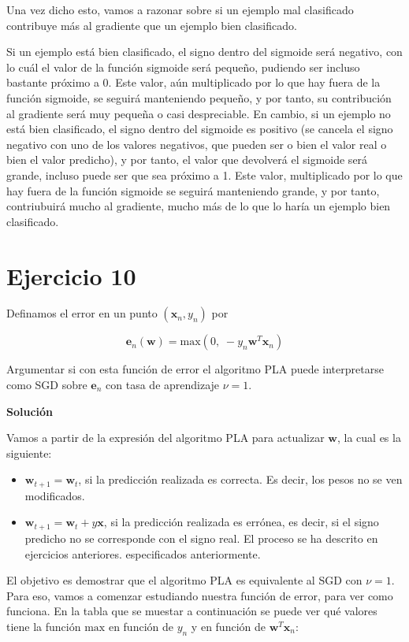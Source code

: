 \documentclass[11pt,a4paper]{article}
\newcommand{\answer}{\noindent\textbf{Solución}}
\newcommand{\maximum}{\text{max}}
\begin{document}
Una vez dicho esto, vamos a razonar sobre si un ejemplo mal clasificado contribuye más al gradiente que un ejemplo bien
clasificado.

Si un ejemplo está bien clasificado, el signo dentro del sigmoide será negativo, con lo cuál el valor de la función sigmoide
será pequeño, pudiendo ser incluso bastante próximo a 0. Este valor, aún multiplicado por lo que hay fuera de la función
sigmoide, se seguirá manteniendo pequeño, y por tanto, su contribución al gradiente será muy pequeña o casi despreciable.
En cambio, si un ejemplo no está bien clasificado, el signo dentro del sigmoide es positivo (se cancela el signo
negativo con uno de los valores negativos, que pueden ser o bien el valor real o bien el valor predicho), y por tanto, el
valor que devolverá el sigmoide será grande, incluso puede ser que sea próximo a 1. Este valor, multiplicado por lo que hay
fuera de la función sigmoide se seguirá manteniendo grande, y por tanto, contriubuirá mucho al gradiente, mucho más de lo
que lo haría un ejemplo bien clasificado.

\section*{Ejercicio 10}

\noindent Definamos el error en un punto $(\mathbf{x}_n, y_n)$ por

\[\mathbf{e}_n(\mathbf{w}) = \maximum(0, \; -y_n\mathbf{w}^T\mathbf{x}_n)\] 

\noindent Argumentar si con esta función de error el algoritmo PLA puede interpretarse como SGD sobre $\mathbf{e}_n$ con tasa
de aprendizaje $\nu = 1$.

\answer

Vamos a partir de la expresión del algoritmo PLA para actualizar $\mathbf{w}$, la cual es la siguiente:

\begin{itemize}
	\item $\mathbf{w}_{t+1} = \mathbf{w}_{t}$, si la predicción realizada es correcta. Es decir, los pesos no se ven
	modificados.
	\item $\mathbf{w}_{t+1} = \mathbf{w}_{t} + y\mathbf{x}$, si la predicción realizada es errónea, es decir, si el signo
	predicho no se corresponde con el signo real. El proceso se ha descrito en ejercicios anteriores.
	especificados anteriormente.
\end{itemize}

El objetivo es demostrar que el algoritmo PLA es equivalente al SGD con $\nu = 1$. Para eso, vamos a comenzar estudiando
nuestra función de error, para ver como funciona. En la tabla que se muestar a continuación se puede ver qué valores
tiene la función $\maximum$ en función de $y_n$ y en función de $\mathbf{w}^T\mathbf{x}_n$:
\end{document}
